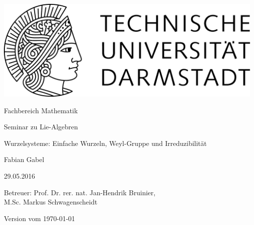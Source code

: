 \begin{titlepage}
  \begin{center}
    \vspace{1cm}
    \includegraphics[width=0.5\linewidth]{TU_Darmstadt_Logo.pdf}
    \vspace{12pt}
    
    \large{Fachbereich Mathematik}
    \vspace{2cm}
    
    \large{Seminar zu Lie-Algebren}
    \vspace{2cm}

    \huge{Wurzelsysteme: Einfache Wurzeln, Weyl-Gruppe und Irreduzibilität}
    
    \vspace*{2cm}    
    
		\large
    Fabian Gabel
    \vspace*{.5cm}

    29.05.2016 \\
    \vspace*{1cm}

    Betreuer: Prof. Dr. rer. nat. Jan-Hendrik Bruinier,  \\
    \hspace{0.6cm}M.Sc. Markus Schwagenscheidt

    \vspace*{.5cm}

    \tiny{Version vom \today}
  \end{center}
\end{titlepage}
\vspace*{\fill}
